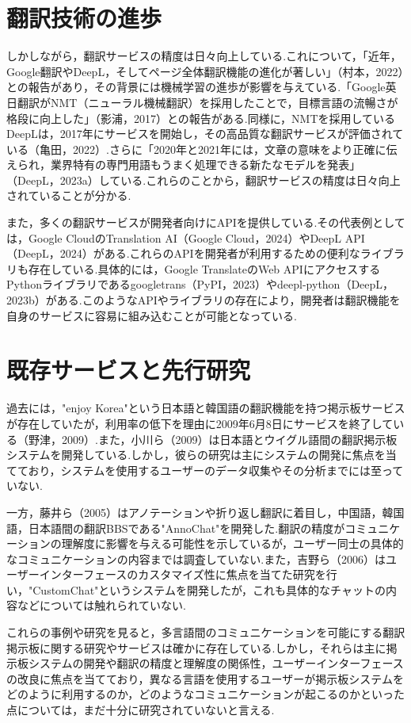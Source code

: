 \documentclass[b5paper,12pt,dvipdfmx]{jsreport}
\begin{document}
\section{翻訳技術の進歩}

しかしながら，翻訳サービスの精度は日々向上している.これについて，「近年，Google翻訳やDeepL，そしてページ全体翻訳機能の進化が著しい」（村本，2022）との報告があり，その背景には機械学習の進歩が影響を与えている.「Google英日翻訳がNMT（ニューラル機械翻訳）を採用したことで，目標言語の流暢さが格段に向上した」（影浦，2017）との報告がある.同様に，NMTを採用しているDeepLは，2017年にサービスを開始し，その高品質な翻訳サービスが評価されている（亀田，2022）.さらに「2020年と2021年には，文章の意味をより正確に伝えられ，業界特有の専門用語もうまく処理できる新たなモデルを発表」（DeepL，2023a）している.これらのことから，翻訳サービスの精度は日々向上されていることが分かる.

また，多くの翻訳サービスが開発者向けにAPIを提供している.その代表例としては，Google CloudのTranslation AI（Google Cloud，2024）やDeepL API（DeepL，2024）がある.これらのAPIを開発者が利用するための便利なライブラリも存在している.具体的には，Google TranslateのWeb APIにアクセスするPythonライブラリであるgoogletrans（PyPI，2023）やdeepl-python（DeepL，2023b）がある.このようなAPIやライブラリの存在により，開発者は翻訳機能を自身のサービスに容易に組み込むことが可能となっている.

\section{既存サービスと先行研究}

過去には，"enjoy Korea"という日本語と韓国語の翻訳機能を持つ掲示板サービスが存在していたが，利用率の低下を理由に2009年6月8日にサービスを終了している（野津，2009）.また，小川ら（2009）は日本語とウイグル語間の翻訳掲示板システムを開発している.しかし，彼らの研究は主にシステムの開発に焦点を当てており，システムを使用するユーザーのデータ収集やその分析までには至っていない.

一方，藤井ら（2005）はアノテーションや折り返し翻訳に着目し，中国語，韓国語，日本語間の翻訳BBSである"AnnoChat"を開発した.翻訳の精度がコミュニケーションの理解度に影響を与える可能性を示しているが，ユーザー同士の具体的なコミュニケーションの内容までは調査していない.また，吉野ら（2006）はユーザーインターフェースのカスタマイズ性に焦点を当てた研究を行い，"CustomChat"というシステムを開発したが，これも具体的なチャットの内容などについては触れられていない.

これらの事例や研究を見ると，多言語間のコミュニケーションを可能にする翻訳掲示板に関する研究やサービスは確かに存在している.しかし，それらは主に掲示板システムの開発や翻訳の精度と理解度の関係性，ユーザーインターフェースの改良に焦点を当てており，異なる言語を使用するユーザーが掲示板システムをどのように利用するのか，どのようなコミュニケーションが起こるのかといった点については，まだ十分に研究されていないと言える.
\end{document}
